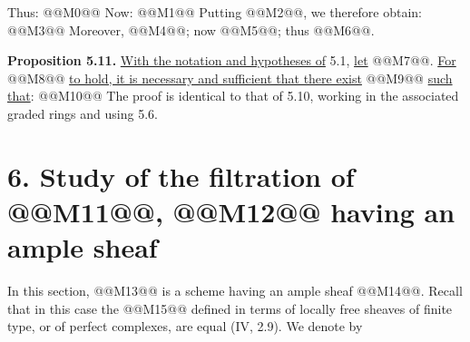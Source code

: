 Thus:
@@M0@@
Now:
@@M1@@
Putting @@M2@@, we therefore obtain:
@@M3@@
Moreover, @@M4@@; now @@M5@@; thus @@M6@@.

\textbf{Proposition 5.11.} \uline{With the notation and hypotheses of} 5.1, \uline{let} @@M7@@. \uline{For} @@M8@@ \uline{to hold, it is necessary and sufficient that there exist} @@M9@@ \uline{such that}:
@@M10@@
The proof is identical to that of 5.10, working in the associated graded rings and using 5.6.

\section*{6. Study of the filtration of \texorpdfstring{@@M11@@}{K^{\bullet}(X)}, @@M12@@ having an ample sheaf}

In this section, @@M13@@ is a scheme having an ample sheaf @@M14@@. Recall that in this case the @@M15@@ defined in terms of locally free sheaves of finite type, or of perfect complexes, are equal (IV, 2.9). We denote by
